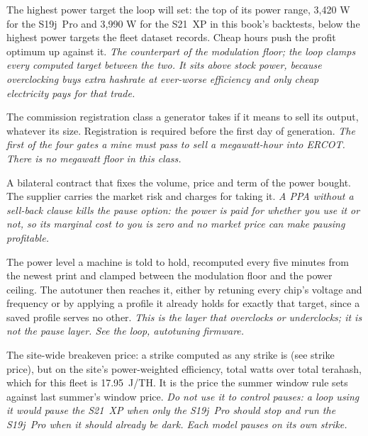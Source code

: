 \begin{description}[leftmargin=0pt,style=unboxed,itemsep=0.35em,parsep=0.15em]
\item[power ceiling] \hypertarget{glossary:power-ceiling}{}The highest power target the loop will set: the top of its power range, 3,420 W for the S19j~Pro and 3,990 W for the S21~XP in this book's backtests, below the highest power targets the fleet dataset records. Cheap hours push the profit optimum up against it. \emph{The counterpart of the modulation floor; the loop clamps every computed target between the two. It sits above stock power, because overclocking buys extra hashrate at ever-worse efficiency and only cheap electricity pays for that trade.}
\item[power generation company] \hypertarget{glossary:power-generation-company}{}The commission registration class a generator takes if it means to sell its output, whatever its size. Registration is required before the first day of generation. \emph{The first of the four gates a mine must pass to sell a megawatt-hour into ERCOT. There is no megawatt floor in this class.}
\item[power purchase agreement (PPA)] \hypertarget{glossary:power-purchase-agreement}{}A bilateral contract that fixes the volume, price and term of the power bought. The supplier carries the market risk and charges for taking it. \emph{A PPA without a sell-back clause kills the pause option: the power is paid for whether you use it or not, so its marginal cost to you is zero and no market price can make pausing profitable.}
\item[power target] \hypertarget{glossary:power-target}{}The power level a machine is told to hold, recomputed every five minutes from the newest print and clamped between the modulation floor and the power ceiling. The autotuner then reaches it, either by retuning every chip's voltage and frequency or by applying a profile it already holds for exactly that target, since a saved profile serves no other. \emph{This is the layer that overclocks or underclocks; it is not the pause layer. See the loop, autotuning firmware.}
\item[power-weighted strike] \hypertarget{glossary:power-weighted-strike}{}The site-wide breakeven price: a strike computed as any strike is (see strike price), but on the site's power-weighted efficiency, total watts over total terahash, which for this fleet is 17.95~J/TH. It is the price the summer window rule sets against last summer's window price. \emph{Do not use it to control pauses: a loop using it would pause the S21~XP when only the S19j~Pro should stop and run the S19j~Pro when it should already be dark. Each model pauses on its own strike.}

\end{description}
